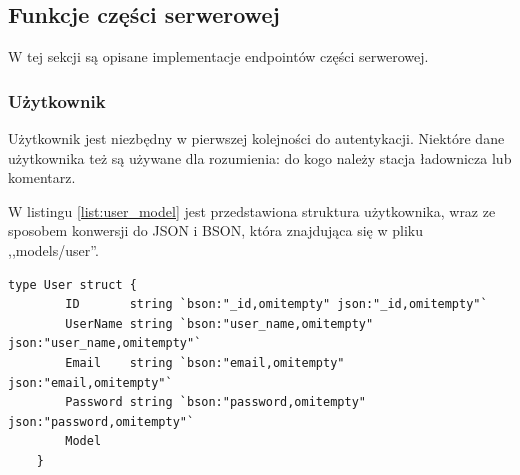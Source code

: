 % 
\subsection{Funkcje części serwerowej}
W tej sekcji są opisane implementacje endpointów części serwerowej.
% 
\subsubsection{Użytkownik}
Użytkownik jest niezbędny w pierwszej kolejności do autentykacji. Niektóre dane użytkownika też są używane dla rozumienia: do kogo należy stacja ładownicza lub komentarz.

W listingu \ref{list:user_model} jest przedstawiona struktura użytkownika, wraz ze sposobem konwersji do JSON i BSON, która znajdująca się w pliku ,,models/user''.
\begin{lstlisting}[label=list:user_model,caption=Model danych użytkownika,basicstyle=\tiny\ttfamily]
    type User struct {
        ID       string `bson:"_id,omitempty" json:"_id,omitempty"`
        UserName string `bson:"user_name,omitempty" json:"user_name,omitempty"`
        Email    string `bson:"email,omitempty" json:"email,omitempty"`
        Password string `bson:"password,omitempty" json:"password,omitempty"`
        Model
    }
\end{lstlisting}

% 

